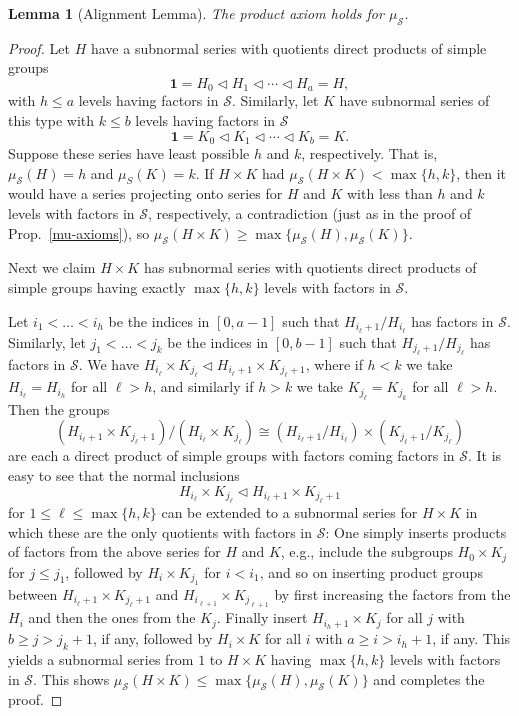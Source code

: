 \documentclass[a4paper,11pt]{amsart}
\newtheorem{lemma}[theorem]{Lemma}
\theoremstyle{definition}
\newcommand{\1}{{\mathbf 1}}
\renewcommand{\S}{{\mathscr{S}}}
\begin{document}
\begin{lemma}[Alignment Lemma]\label{alignment}
The product axiom holds for $\mu_\S$. 
\end{lemma}
\begin{proof} Let $H$ have a subnormal series with quotients direct products of simple groups
$$\1  =H_0 \lhd H_1 \lhd \cdots \lhd H_a=H,$$ with $h\leq a$ levels having factors in $\S$.
Similarly,  let $K$ have subnormal series of this type with $k \leq b$ levels having factors in $\S$
$$\1 =K_0 \lhd K_1 \lhd \cdots \lhd K_b=K.$$ 
Suppose these series have least possible $h$ and $k$, respectively.  That is, $\mu_\S(H)=h$ and $\mu_S(K)=k$.
If $H\times K$ had $\mu_\S(H\times K) < \max\{h,k\}$, then it would have a series projecting onto series for $H$ and $K$ with less than $h$ and $k$ levels with factors in $\S$, respectively, a contradiction (just as in the proof of Prop.~\ref{mu-axioms}), so $\mu_\S(H\times K) \geq \max\{\mu_\S(H),\mu_\S(K)\}$.

Next we claim $H\times K$ has subnormal series with quotients direct products of simple groups having exactly $\max\{h,k\}$ levels with factors in $\S$.  

Let $i_1 < \ldots < i_h$ be the indices in $[0,a-1]$ such that $H_{i_\ell +1}/H_{i_\ell}$ has factors in $\S$.
Similarly, let $j_1 < \ldots < j_k$ be the indices in $[0,b-1]$ such that $H_{j_\ell+1}/H_{j_\ell}$ has factors in $\S$.
We have $H_{i_\ell} \times K_{j_\ell } \lhd H_{i_\ell+1} \times K_{j_\ell+1}$, where if $h<k$ we take $H_{i_\ell}=H_{i_h}$ for all $\ell>h$, and similarly if $h>k$ we take $K_{j_\ell}=K_{j_k}$ for all $\ell>h$. 
Then the groups $$(H_{i_\ell+1} \times K_{j_\ell+1})/(H_{i_\ell} \times K_{j_\ell})\cong 
(H_{i_\ell+1}/ H_{i_\ell}) \times (K_{j_\ell+1} / K_{j_\ell})$$
are each a direct product of simple groups with factors coming  factors in $\S$.
It is easy to see that the normal inclusions $$H_{i_\ell} \times K_{j_\ell } \lhd H_{i_\ell+1} \times K_{j_\ell+1}$$ for $1\leq \ell \leq \max\{h,k\}$ can be extended to a subnormal series for $H\times K$ in which these are the only quotients with factors in $\S$:  One simply inserts products of factors from the above series for $H$ and $K$, e.g., include the subgroups $H_0 \times K_j$ for $j \leq j_1$, followed by $H_i\times K_{j_1}$ for $i < i_1$, and so on inserting product groups between $H_{i_\ell+1} \times K_{j_\ell+1}$ and $H_{i_{\ell+1}} \times K_{j_{\ell+1}}$ 
by first increasing the factors from the $H_i$ and then the ones from the $K_j$. Finally insert $H_{i_h+1}\times K_j$
for all $j$ with $b\geq j>{j_k+1}$, if any, followed by $H_i \times K$ for all $i$ with $a\geq i > {i_h+1}$, if any. This yields a subnormal series from $1$ to $H\times K$ having $\max\{h,k\}$ levels with factors in $\S$. 
This shows $\mu_\S(H\times K)\leq \max\{\mu_\S(H), \mu_\S(K)\}$ and completes the proof.\end{proof} 
\end{document}
